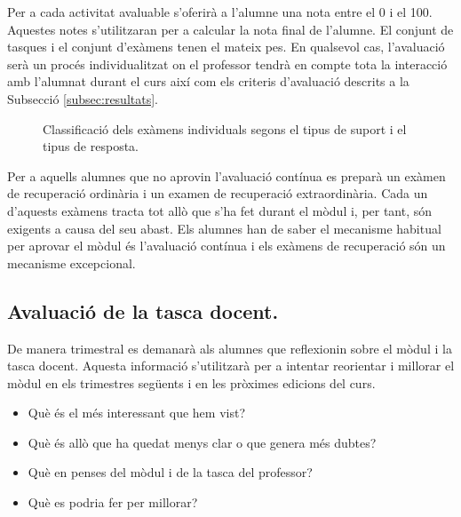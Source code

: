 \documentclass[catalan, a4paper, 12pt, titlepage]{article}
\begin{document}
Per a cada activitat avaluable s'oferirà a l'alumne una nota entre el 0 i el 100.
Aquestes notes s'utilitzaran per a calcular la nota final de l'alumne.
El conjunt de tasques i el conjunt d'exàmens tenen el mateix pes.
En qualsevol cas, l'avaluació serà un procés individualitzat on el professor tendrà en compte tota la interacció amb l'alumnat durant el curs així com els criteris d'avaluació descrits a la Subsecció \ref{subsec:resultats}.

\begin{figure}
\centering
{}
\caption{Classificació dels exàmens individuals segons el tipus de suport i el tipus de resposta.} \label{fig:M1}
\end{figure}

Per a aquells alumnes que no aprovin l'avaluació contínua es preparà un exàmen de recuperació ordinària i un examen de recuperació extraordinària. Cada un d'aquests exàmens tracta tot allò que s'ha fet durant el mòdul i, per tant, són exigents a causa del seu abast. Els alumnes han de saber el mecanisme habitual per aprovar el mòdul és l'avaluació contínua i els exàmens de recuperació són un mecanisme excepcional.

\subsection{Avaluació de la tasca docent.}

De manera trimestral es demanarà als alumnes que reflexionin sobre el mòdul i la tasca docent. Aquesta informació s'utilitzarà per a intentar reorientar i millorar el mòdul en els trimestres següents i en les pròximes edicions del curs. 

\begin{itemize}
	\item Què és el més interessant que hem vist?
	\item Què és allò que ha quedat menys clar o que genera més dubtes?
	\item Què en penses del mòdul i de la tasca del professor?
	\item Què es podria fer per millorar?
\end{itemize}
\end{document}
